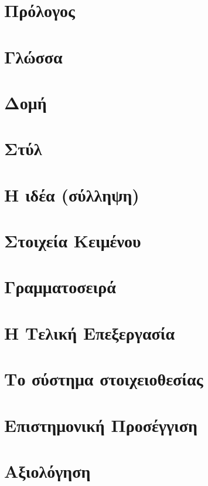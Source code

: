\documentclass[a4paper,12pt,oneside]{book}
\begin{document}

\frontmatter

\clearpage

\clearpage




\mainmatter
\setcounter{page}{1}
\chapter{Πρόλογος}

\chapter{Γλώσσα}

\chapter{Δομή}

\chapter{Στύλ}

\chapter{Η ιδέα (σύλληψη)}

\chapter{Στοιχεία Κειμένου}

\chapter{Γραμματοσειρά}

\chapter{Η Τελική Επεξεργασία}

\chapter{Το σύστημα στοιχειοθεσίας}

\chapter{Επιστημονική Προσέγγιση}

\chapter{Αξιολόγηση}

\end{document}
